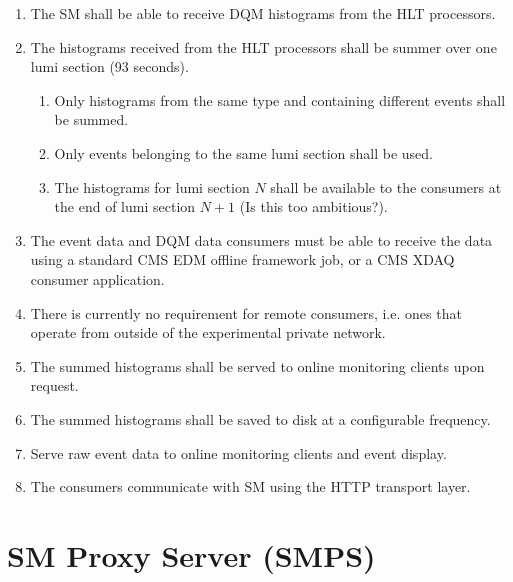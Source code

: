 \documentclass[]{article}
\begin{document}
\begin{enumerate}

\item The SM shall be able to receive DQM histograms from the HLT processors.

\item The histograms received from the HLT processors shall be summer over one lumi section (93 seconds).
\begin{enumerate}
\item Only histograms from the same type and containing different events shall be summed.
\item Only events belonging to the same lumi section shall be used.
\item The histograms for lumi section $N$ shall be available to the consumers at the end of lumi section $N+1$ (Is this too ambitious?).
\end{enumerate}

\item The event data and DQM data consumers must be able to receive the data using a standard CMS EDM offline framework job, or a CMS XDAQ consumer application.

\item There is currently no requirement for remote consumers, i.e. ones that operate from outside of the experimental private network.

\item The summed histograms shall be served to online monitoring clients upon request.

\item The summed histograms shall be saved to disk at a configurable frequency.

\item Serve raw event data to online monitoring clients and event display.

\item The consumers communicate with SM using the HTTP transport layer.

\end{enumerate}


\section{SM Proxy Server (SMPS)}
\end{document}
